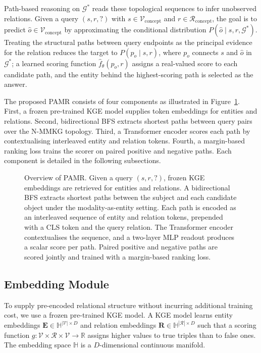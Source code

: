 \documentclass[runningheads]{llncs}
\begin{document}
Path-based reasoning on $\mathcal{G}^*$ reads these topological sequences
to infer unobserved relations. Given a query $(s, r, ?)$ with
$s \in \mathcal{V}_{\text{concept}}$ and $r \in
\mathcal{R}_{\text{concept}}$, the goal is to predict $\hat{o} \in
\mathcal{V}_{\text{concept}}$ by approximating the conditional
distribution $P(\hat{o} \mid s, r, \mathcal{G}^*)$. Treating the
structural paths between query endpoints as the principal evidence for
the relation reduces the target to $P(p_o \mid s, r)$, where $p_o$
connects $s$ and $\hat{o}$ in $\mathcal{G}^*$; a learned scoring function
$\hat{f}_\theta(p_o, r)$ assigns a real-valued score to each candidate
path, and the entity behind the highest-scoring path is selected as the
answer.

The proposed PAMR consists of four components as illustrated in
Figure~\ref{fig:overview}. First, a frozen pre-trained KGE model supplies
token embeddings for entities and relations. Second, bidirectional BFS
extracts shortest paths between query pairs over the N-MMKG topology.
Third, a Transformer encoder scores each path by contextualising
interleaved entity and relation tokens. Fourth, a margin-based ranking
loss trains the scorer on paired positive and negative paths. Each
component is detailed in the following subsections.

\begin{figure}[t]
  \centering
  
  \caption{Overview of PAMR. Given a query $(s, r, ?)$, frozen KGE embeddings are retrieved for entities and relations. A bidirectional BFS extracts shortest paths between the subject and each candidate object under the modality-as-entity setting. Each path is encoded as an interleaved sequence of entity and relation tokens, prepended with a CLS token and the query relation. The Transformer encoder contextualises the sequence, and a two-layer MLP readout produces a scalar score per path. Paired positive and negative paths are scored jointly and trained with a margin-based ranking loss.}
  \label{fig:overview}
\end{figure}

\subsection{Embedding Module}
\label{sec:embedding-module}

To supply pre-encoded relational structure without incurring additional
training cost, we use a frozen pre-trained KGE model.  A KGE model
learns entity embeddings $\mathbf{E} \in \mathbb{H}^{|\mathcal{V}| \times D}$
and relation embeddings $\mathbf{R} \in \mathbb{H}^{|\mathcal{R}| \times D}$
such that a scoring function $g: \mathcal{V} \times \mathcal{R} \times
\mathcal{V} \to \mathbb{R}$ assigns higher values to true triples
than to false ones.  The embedding space $\mathbb{H}$ is a
$D$-dimensional continuous manifold.
\end{document}
